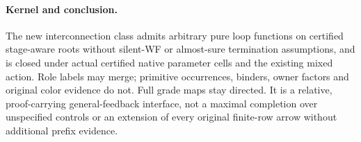 \documentclass[11pt]{article}
\begin{document}
\paragraph{Kernel and conclusion.}
The new interconnection class admits arbitrary pure loop functions on certified stage-aware roots without silent-WF or almost-sure termination assumptions, and is closed under actual certified native parameter cells and the existing mixed action. Role labels may merge; primitive occurrences, binders, owner factors and original color evidence do not. Full grade maps stay directed. It is a relative, proof-carrying general-feedback interface, not a maximal completion over unspecified controls or an extension of every original finite-row arrow without additional prefix evidence.
\end{document}
